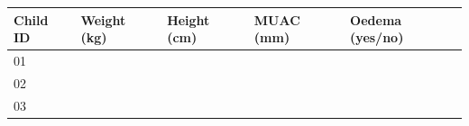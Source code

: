 \documentclass[12pt,]{book}
\theoremstyle{definition}
\theoremstyle{definition}
\theoremstyle{definition}
\theoremstyle{remark}
\begin{document}
\begin{longtable}[]{@{}lllll@{}}
\toprule
\begin{minipage}[b]{0.17\columnwidth}\raggedright
Child ID\strut
\end{minipage} & \begin{minipage}[b]{0.17\columnwidth}\raggedright
Weight (kg)\strut
\end{minipage} & \begin{minipage}[b]{0.17\columnwidth}\raggedright
Height (cm)\strut
\end{minipage} & \begin{minipage}[b]{0.17\columnwidth}\raggedright
MUAC (mm)\strut
\end{minipage} & \begin{minipage}[b]{0.17\columnwidth}\raggedright
Oedema (yes/no)\strut
\end{minipage}\tabularnewline
\midrule
\endhead
\begin{minipage}[t]{0.17\columnwidth}\raggedright
01\strut
\end{minipage} & \begin{minipage}[t]{0.17\columnwidth}\raggedright
\strut
\end{minipage} & \begin{minipage}[t]{0.17\columnwidth}\raggedright
\strut
\end{minipage} & \begin{minipage}[t]{0.17\columnwidth}\raggedright
\strut
\end{minipage} & \begin{minipage}[t]{0.17\columnwidth}\raggedright
\strut
\end{minipage}\tabularnewline
\begin{minipage}[t]{0.17\columnwidth}\raggedright
02\strut
\end{minipage} & \begin{minipage}[t]{0.17\columnwidth}\raggedright
\strut
\end{minipage} & \begin{minipage}[t]{0.17\columnwidth}\raggedright
\strut
\end{minipage} & \begin{minipage}[t]{0.17\columnwidth}\raggedright
\strut
\end{minipage} & \begin{minipage}[t]{0.17\columnwidth}\raggedright
\strut
\end{minipage}\tabularnewline
\begin{minipage}[t]{0.17\columnwidth}\raggedright
03\strut

\end{minipage}
\end{longtable}
\end{document}
